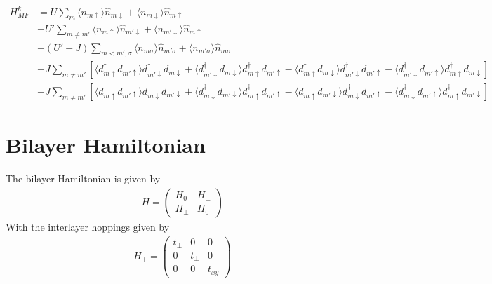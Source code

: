 \documentclass[11pt]{article}
\begin{document}
\begin{align}
    H^k_{MF} &= U \sum_m \langle n_{m\uparrow}\rangle \hat n_{m\downarrow} + \langle n_{m\downarrow}\rangle \hat n_{m\uparrow} \\\nonumber
    &+ U' \sum_{m \neq m'} \langle n_{m\uparrow}\rangle \hat n_{m'\downarrow}
    + \langle n_{m' \downarrow}\rangle \hat n_{m\uparrow}  \\\nonumber
    &+ (U'-J) \sum_{m < m', \sigma} \langle n_{m\sigma} \rangle \hat n_{m'\sigma}
    + \langle n_{m' \sigma} \rangle \hat n_{m\sigma} \\\nonumber
    &+ J\sum_{m\neq m'}\left[\langle d^\dagger_{m\uparrow} d_{m'\uparrow} \rangle d^\dagger_{m' \downarrow} d_{m\downarrow}
    + \langle d^\dagger_{m' \downarrow} d_{m\downarrow}\rangle d^\dagger_{m\uparrow}d_{m' \uparrow}
    - \langle d^\dagger_{m \uparrow} d_{m\downarrow}\rangle d^\dagger_{m'\downarrow}d_{m'\uparrow}
    - \langle d^\dagger_{m'\downarrow} d_{m'\uparrow} \rangle d^\dagger_{m\uparrow} d_{m \downarrow}\right] \\\nonumber
    &+ J\sum_{m\neq m'}\left[
        \langle d^\dagger_{m\uparrow} d_{m'\uparrow}\rangle d^\dagger_{m\downarrow} d_{m'\downarrow}
        +\langle d^\dagger_{m\downarrow} d_{m'\downarrow}\rangle d^\dagger_{m\uparrow}d_{m'\uparrow}
        - \langle d^\dagger_{m\uparrow} d_{m'\downarrow}\rangle d^\dagger_{m\downarrow}d_{m'\uparrow}
        - \langle d^\dagger_{m\downarrow} d_{m'\uparrow}\rangle d^\dagger_{m\uparrow} d_{m'\downarrow}
    \right]
\end{align}

\section{Bilayer Hamiltonian}
The bilayer Hamiltonian is given by
\begin{gather}
    H = \begin{pmatrix}
        H_0 & H_\perp \\
        H_\perp & H_0
    \end{pmatrix}
\end{gather}
With the interlayer hoppings given by
\begin{gather}
    H_\perp = \begin{pmatrix}
        t_{\perp} & 0 & 0 \\
        0 & t_{\perp} & 0 \\
        0 & 0 & t_{xy}
    \end{pmatrix}
\end{gather}
\end{document}
